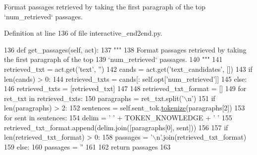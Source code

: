 \begin{DoxyVerb}Format passages retrieved by taking the first paragraph of the top
`num_retrieved` passages.
\end{DoxyVerb}
 

Definition at line 136 of file interactive\+\_\+end2end.\+py.


\begin{DoxyCode}
136     \textcolor{keyword}{def }get\_passages(self, act):
137         \textcolor{stringliteral}{"""}
138 \textcolor{stringliteral}{        Format passages retrieved by taking the first paragraph of the top}
139 \textcolor{stringliteral}{        `num\_retrieved` passages.}
140 \textcolor{stringliteral}{        """}
141         retrieved\_txt = act.get(\textcolor{stringliteral}{'text'}, \textcolor{stringliteral}{''})
142         cands = act.get(\textcolor{stringliteral}{'text\_candidates'}, [])
143         \textcolor{keywordflow}{if} len(cands) > 0:
144             retrieved\_txts = cands[: self.opt[\textcolor{stringliteral}{'num\_retrieved'}]]
145         \textcolor{keywordflow}{else}:
146             retrieved\_txts = [retrieved\_txt]
147 
148         retrieved\_txt\_format = []
149         \textcolor{keywordflow}{for} ret\_txt \textcolor{keywordflow}{in} retrieved\_txts:
150             paragraphs = ret\_txt.split(\textcolor{stringliteral}{'\(\backslash\)n'})
151             \textcolor{keywordflow}{if} len(paragraphs) > 2:
152                 sentences = self.sent\_tok.\hyperlink{namespaceparlai_1_1agents_1_1tfidf__retriever_1_1build__tfidf_a1fdb457e98eb4e4c26047e229686a616}{tokenize}(paragraphs[2])
153                 \textcolor{keywordflow}{for} sent \textcolor{keywordflow}{in} sentences:
154                     delim = \textcolor{stringliteral}{' '} + TOKEN\_KNOWLEDGE + \textcolor{stringliteral}{' '}
155                     retrieved\_txt\_format.append(delim.join([paragraphs[0], sent]))
156 
157         \textcolor{keywordflow}{if} len(retrieved\_txt\_format) > 0:
158             passages = \textcolor{stringliteral}{'\(\backslash\)n'}.join(retrieved\_txt\_format)
159         \textcolor{keywordflow}{else}:
160             passages = \textcolor{stringliteral}{''}
161 
162         \textcolor{keywordflow}{return} passages
163 
\end{DoxyCode}
\mbox{\label{classprojects_1_1wizard__of__wikipedia_1_1interactive__end2end_1_1interactive__end2end_1_1InteractiveEnd2endAgent_acffd7591e88cc870724f242e628b748e}} 
